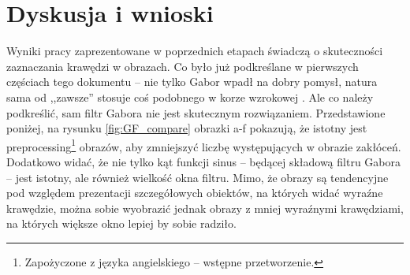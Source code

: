 \section{Dyskusja i wnioski}
\label{aGabor_dyskusja}

Wyniki pracy zaprezentowane w poprzednich etapach świadczą o skuteczności zaznaczania krawędzi w obrazach. Co było już podkreślane w pierwszych częściach tego dokumentu -- nie tylko Gabor wpadł na dobry pomysł, natura sama od ,,zawsze'' stosuje coś podobnego w korze wzrokowej \cite{Jones1987}. Ale co należy podkreślić, sam filtr Gabora nie jest skutecznym rozwiązaniem. Przedstawione poniżej, na rysunku \ref{fig:GF_compare} obrazki a-f pokazują, że istotny jest preprocessing\footnote{Zapożyczone z języka angielskiego -- wstępne przetworzenie.} obrazów, aby zmniejszyć liczbę występujących w obrazie zakłóceń. Dodatkowo widać, że nie tylko kąt funkcji sinus -- będącej składową filtru Gabora -- jest istotny, ale również wielkość okna filtru. Mimo, że obrazy są tendencyjne pod względem prezentacji szczegółowych obiektów, na których widać wyraźne krawędzie, można sobie wyobrazić jednak obrazy z mniej wyraźnymi krawędziami, na których większe okno lepiej by sobie radziło.

